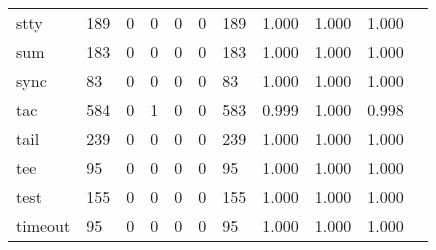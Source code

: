 \begin{longtable}{lp{1.10cm}p{1.10cm}p{1.10cm}p{1.10cm}p{1.10cm}p{1.10cm}p{1.10cm}p{1.10cm}p{1.10cm}p{1.10cm}}
stty      &                    189 &                                  0 &                                 0 &                                0 &                                 0 &                             189 &                          1.000 &                                 1.000 &                               1.000 \\
sum       &                    183 &                                  0 &                                 0 &                                0 &                                 0 &                             183 &                          1.000 &                                 1.000 &                               1.000 \\
sync      &                     83 &                                  0 &                                 0 &                                0 &                                 0 &                              83 &                          1.000 &                                 1.000 &                               1.000 \\
tac       &                    584 &                                  0 &                                 1 &                                0 &                                 0 &                             583 &                          0.999 &                                 1.000 &                               0.998 \\
tail      &                    239 &                                  0 &                                 0 &                                0 &                                 0 &                             239 &                          1.000 &                                 1.000 &                               1.000 \\
tee       &                     95 &                                  0 &                                 0 &                                0 &                                 0 &                              95 &                          1.000 &                                 1.000 &                               1.000 \\
test      &                    155 &                                  0 &                                 0 &                                0 &                                 0 &                             155 &                          1.000 &                                 1.000 &                               1.000 \\
timeout   &                     95 &                                  0 &                                 0 &                                0 &                                 0 &                              95 &                          1.000 &                                 1.000 &                               1.000 \\

\end{longtable}
